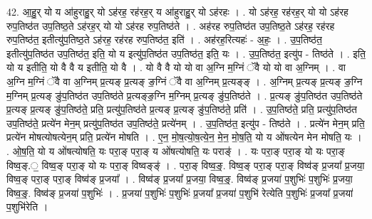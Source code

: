 \documentclass[17pt]{extarticle}
\begin{document}
42. आ॒हु॒र् यो य आ॑हुराहु॒र् यो ऽह॑रह॒ रह॑रह॒र् य आ॑हुराहु॒र् यो ऽह॑रहः । . यो ऽह॑रह॒ रह॑रह॒र् यो यो ऽह॑रह रुप॒तिष्ठ॑त उप॒तिष्ठ॒ते ऽह॑रह॒र् यो यो ऽह॑रह रुप॒तिष्ठ॑ते । . अह॑रह रुप॒तिष्ठ॑त उप॒तिष्ठ॒ते ऽह॑रह॒ रह॑रह रुप॒तिष्ठ॑त॒ इतीत्यु॑प॒तिष्ठ॒ते ऽह॑रह॒ रह॑रह रुप॒तिष्ठ॑त॒ इति॑ । . अह॑रह॒रित्यहः॑ - अ॒हः॒ । . उ॒प॒तिष्ठ॑त॒ इतीत्यु॑प॒तिष्ठ॑त उप॒तिष्ठ॑त॒ इति॒ यो य इत्यु॑प॒तिष्ठ॑त उप॒तिष्ठ॑त॒ इति॒ यः । . उ॒प॒तिष्ठ॑त॒ इत्यु॑प - तिष्ठ॑ते । . इति॒ यो य इतीति॒ यो वै वै य इतीति॒ यो वै । . यो वै वै यो यो वा अ॒ग्नि म॒ग्निं ॅवै यो यो वा अ॒ग्निम् । . वा अ॒ग्नि म॒ग्निं ॅवै वा अ॒ग्निम् प्र॒त्यङ् प्र॒त्यङ् ङ॒ग्निं ॅवै वा अ॒ग्निम् प्र॒त्यङ्ङ् । . अ॒ग्निम् प्र॒त्यङ् प्र॒त्यङ् ङ॒ग्नि म॒ग्निम् प्र॒त्यङ् ङु॑प॒तिष्ठ॑त उप॒तिष्ठ॑ते प्र॒त्यङ्ङ॒ग्नि म॒ग्निम् 
प्र॒त्यङ् ङु॑प॒तिष्ठ॑ते । . प्र॒त्यङ् ङु॑प॒तिष्ठ॑त उप॒तिष्ठ॑ते प्र॒त्यङ् प्र॒त्यङ् ङु॑प॒तिष्ठ॑ते॒ प्रति॒ प्रत्यु॑प॒तिष्ठ॑ते 
प्र॒त्यङ् प्र॒त्यङ् ङु॑प॒तिष्ठ॑ते॒ प्रति॑ । . उ॒प॒तिष्ठ॑ते॒ प्रति॒ प्रत्यु॑प॒तिष्ठ॑त उप॒तिष्ठ॑ते॒ प्रत्ये॑न मेन॒म् प्रत्यु॑प॒तिष्ठ॑त उप॒तिष्ठ॑ते॒ प्रत्ये॑नम् । . उ॒प॒तिष्ठ॑त॒ इत्यु॑प - तिष्ठ॑ते । . प्रत्ये॑न मेन॒म् प्रति॒ प्रत्ये॑न मोषत्योषत्येन॒म् प्रति॒ प्रत्ये॑न मोषति । . ए॒न॒ मो॒ष॒त्यो॒ष॒त्ये॒न॒ मे॒न॒ मो॒ष॒ति॒ यो य ओ॑षत्येन मेन मोषति॒ यः । . ओ॒ष॒ति॒ यो य ओ॑षत्योषति॒ यः परा॒ङ् परा॒ङ् य ओ॑षत्योषति॒ यः पराङ्॑ । . यः परा॒ङ् परा॒ङ् यो यः परा॒ङ् विष्व॒ङ्.॒ विष्व॒ङ् परा॒ङ् यो यः परा॒ङ् विष्वङ्ङ्॑ । . परा॒ङ् विष्व॒ङ्॒. विष्व॒ङ् परा॒ङ् परा॒ङ् विष्व॑ङ् प्र॒जया᳚ प्र॒जया॒ विष्व॒ङ् परा॒ङ् परा॒ङ् विष्व॑ङ् प्र॒जया᳚ । . विष्व॑ङ् प्र॒जया᳚ प्र॒जया॒ विष्व॒ङ्॒. विष्व॑ङ् प्र॒जया॑ प॒शुभिः॑ प॒शुभिः॑ प्र॒जया॒ विष्व॒ङ्॒. विष्व॑ङ् प्र॒जया॑ प॒शुभिः॑ । . प्र॒जया॑ प॒शुभिः॑ प॒शुभिः॑ प्र॒जया᳚ प्र॒जया॑ प॒शुभि॑ रेत्येति प॒शुभिः॑ प्र॒जया᳚ प्र॒जया॑ प॒शुभि॑रेति । \newline
\end{document}
